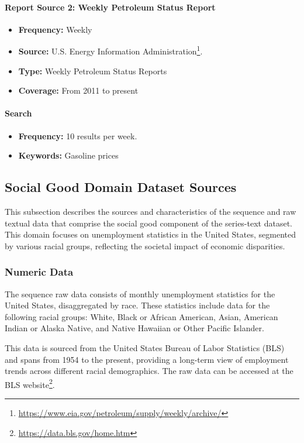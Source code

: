 \paragraph{Report Source 2: Weekly Petroleum Status Report}
\begin{itemize}
    \item \textbf{Frequency:} Weekly
    \item \textbf{Source:} U.S. Energy Information Administration\footnote{\url{https://www.eia.gov/petroleum/supply/weekly/archive/}}.
    \item \textbf{Type:} Weekly Petroleum Status Reports
    \item \textbf{Coverage:} From 2011 to present
\end{itemize}
\paragraph{Search}
\begin{itemize}
    \item \textbf{Frequency:} 10 results per week.
    \item \textbf{Keywords:} Gasoline prices
\end{itemize}



\subsection{Social Good Domain Dataset Sources}

This subsection describes the sources and characteristics of the sequence and raw textual data that comprise the social good component of the series-text dataset. This domain focuses on unemployment statistics in the United States, segmented by various racial groups, reflecting the societal impact of economic disparities.

\subsubsection{Numeric Data}
The sequence raw data consists of monthly unemployment statistics for the United States, disaggregated by race. These statistics include data for the following racial groups: White, Black or African American, Asian, American Indian or Alaska Native, and Native Hawaiian or Other Pacific Islander.

This data is sourced from the United States Bureau of Labor Statistics (BLS) and spans from 1954 to the present, providing a long-term view of employment trends across different racial demographics. The raw data can be accessed at the BLS website\footnote{\url{https://data.bls.gov/home.htm}}.

